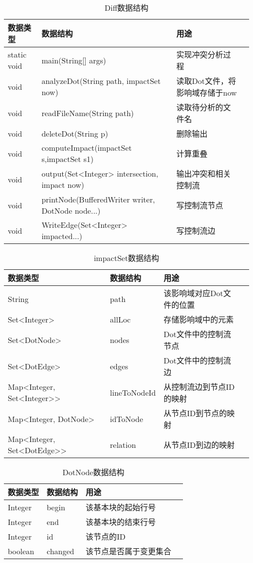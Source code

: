 \begin{table}[H]
	\caption{Diff数据结构}
	\label{diff_data}
	\centering
	\begin{tabular}{lllc}
		\toprule[1.5pt]
		{\heiti 数据类型} &{\heiti 数据结构} & {\heiti 用途} \\\midrule[1pt]
		static void & main(String[] args) & 实现冲突分析过程\\
		void & analyzeDot(String path, impactSet now) & 读取Dot文件，将影响域存储于now \\
		void & readFileName(String path) & 读取待分析的文件名\\
		void & deleteDot(String p) & 删除输出\\
		void & computeImpact(impactSet s,impactSet s1) & 计算重叠\\
		void & output(Set<Integer> intersection, impact now) & 输出冲突和相关控制流\\
		void & printNode(BufferedWriter writer, DotNode node...) & 写控制流节点\\
		void &  WriteEdge(Set<Integer>  impacted...) & 写控制流边\\
		\bottomrule[1.5pt] 
	\end{tabular}
\end{table}

\begin{table}[H]
	\caption{impactSet数据结构}
	\label{impact_data}
	\centering
	\begin{tabular}{lllc}
		\toprule[1.5pt]
		{\heiti 数据类型} &{\heiti 数据结构} & {\heiti 用途} \\\midrule[1pt]
		String     &  path & 该影响域对应Dot文件的位置 \\
		Set<Integer>  &  allLoc & 存储影响域中的元素 \\
		Set<DotNode>  & nodes & Dot文件中的控制流节点\\
		Set<DotEdge>  & edges & Dot文件中的控制流边\\
		Map<Integer, Set<Integer>> & lineToNodeId & 从控制流边到节点ID的映射\\
		Map<Integer, DotNode>  & idToNode & 从节点ID到节点的映射 \\
		Map<Integer, Set<DotEdge>>  &  relation & 从节点ID到边的映射 \\
		\bottomrule[1.5pt] 
	\end{tabular}
\end{table}

\begin{table}[H]
	\caption{DotNode数据结构}
	\label{node_data}
	\centering
	\begin{tabular}{lllc}
		\toprule[1.5pt]
		{\heiti 数据类型} &{\heiti 数据结构} & {\heiti 用途} \\\midrule[1pt]
		Integer    &   begin & 该基本块的起始行号 \\
		Integer    &   end  & 该基本块的结束行号 \\
		Integer    & id & 该节点的ID \\
		boolean    & changed & 该节点是否属于变更集合 \\
		\bottomrule[1.5pt] 
	\end{tabular}
\end{table}

